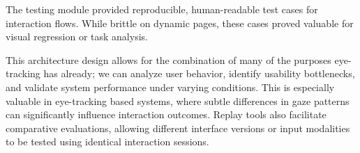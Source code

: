 The testing module provided reproducible, human-readable test cases for interaction flows. While brittle on dynamic pages, these cases proved valuable for visual regression or task analysis. 

This architecture design allows for the combination of many of the purposes eye-tracking has already; we can analyze user behavior, identify usability bottlenecks, and validate system performance under varying conditions. This is especially valuable in eye-tracking based systems, where subtle differences in gaze patterns can significantly influence interaction outcomes. Replay tools also facilitate comparative evaluations, allowing different interface versions or input modalities to be tested using identical interaction sessions.


